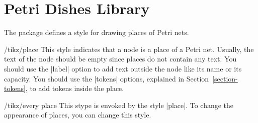 \documentclass{ltxdoc}
\begin{document}
\chapter{Petri Dishes Library}

The package defines a style for drawing places of Petri nets. 

\begin{stylekey}{/tikz/place}
  This style indicates that a node is a place of a Petri net. Usually,
  the text of the node should be empty since places do not contain any
  text. You should use the |label| option to add text outside the node
  like its name or its capacity. You should use the |tokens| options,
  explained in Section~\ref{section-tokens}, to add tokens inside the
  place.
  
\begin{codeexample}[]
\end{codeexample}
  
  \begin{stylekey}{/tikz/every place}
    This stype is envoked by the style |place|. To change the
    appearance of places, you can change this style.
\begin{codeexample}[]
\end{codeexample}
  \end{stylekey}
\end{stylekey}


\end{document}
